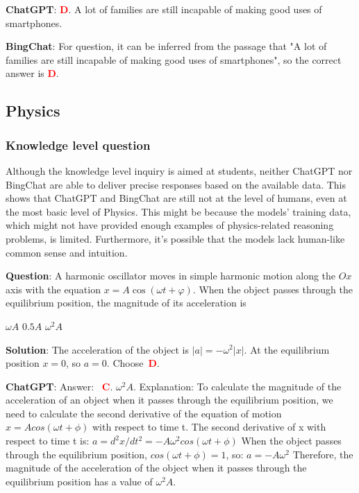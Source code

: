 \documentclass{article}
\begin{document}
{\begin{mdframed}[linewidth=1pt,linecolor=red]
		\textbf{ChatGPT}: \textcolor{red}{\textbf{D}}. A lot of families are still incapable of making good uses of smartphones.  
		
		\textbf{BingChat}: For question, it can be inferred from the passage that "A lot of families are still incapable of making good uses of smartphones", so the correct answer is \textcolor{red}{\textbf{D}}.
		
	\end{mdframed}
	
	\subsection{Physics}
	\label{VNHSGE_Phy}
	
	\subsubsection{Knowledge level question}
	\label{VNHSGE_Phy_K}
	
	Although the knowledge level inquiry is aimed at students, neither ChatGPT nor BingChat are able to deliver precise responses based on the available data. This shows that ChatGPT and BingChat are still not at the level of humans, even at the most basic level of Physics. This might be because the models' training data, which might not have provided enough examples of physics-related reasoning problems, is limited. Furthermore, it's possible that the models lack human-like common sense and intuition.
	
	\begin{mdframed}[linewidth=1pt,linecolor=red] \textbf{Question}: A harmonic oscillator moves in simple harmonic motion along the $Ox$ axis with the equation $x=A\cos(\omega t+\varphi)$. When the object passes through the equilibrium position, the magnitude of its acceleration is 
		
		\begin{oneparchoices}
			\choice $\omega A$
			\choice $0.5 A$
			\choice $\omega^2 A$
		\end{oneparchoices}
		
		\textbf{Solution}: The acceleration of the object is $|a|=-\omega^2 |x|$.
		At the equilibrium position $x=0$, so $a=0$. Choose~\textcolor{red}{\textbf{D}}.
		
		\textbf{ChatGPT}: Answer: ~\textcolor{red}{\textbf{C}}. $\omega^2A$. Explanation:
		To calculate the magnitude of the acceleration of an object when it passes through the equilibrium position, we need to calculate the second derivative of the equation of motion $x = Acos(\omega t+\phi)$ with respect to time t. The second derivative of x with respect to time t is:
		$a = d^2x/dt^2 = -A \omega^2cos(\omega t+\phi)$
		When the object passes through the equilibrium position, $cos(\omega t+\phi) = 1$, so:
		$a = -A \omega^2$
		Therefore, the magnitude of the acceleration of the object when it passes through the equilibrium position has a value of $\omega^2A$.
		

\end{mdframed}}
\end{document}
